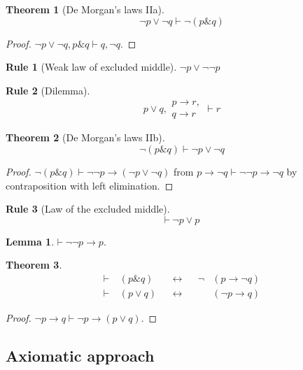 \documentclass{amsbook}
\newcommand{\infers}{\mathrel\vdash}
\newcommand{\theorem}{\mathord\vdash\medspace}
\newcommand{\then}{\mathrel\rightarrow}
\newcommand{\conj}{\mathrel\&}
\newcommand{\eqv}{\mathrel\leftrightarrow}
\newcommand{\disj}{\mathrel\vee}
\theoremstyle{definition}
\newtheorem{frule}{Rule}[chapter]
\newtheorem{thm}{Theorem}[section]
\newtheorem{lmm}{Lemma}[section]
\begin{document}
\begin{thm}[De Morgan's laws IIa]
    $$\neg p \disj \neg q \infers \neg(p \conj q)$$
    \begin{proof}
        $\neg p \disj \neg q, p \conj q \infers q, \neg q$.
    \end{proof}
\end{thm}

\begin{frule}[Weak law of excluded middle]
    $\neg p \disj \neg\neg p$
\end{frule}

\begin{frule}[Dilemma]
    $$p \disj q,\begin{aligned}
            p \then r, \\ q \then r
        \end{aligned} \infers r$$
\end{frule}

\begin{thm}[De Morgan's laws IIb]
    $$\neg(p \conj q) \infers \neg p \disj \neg q$$
    \begin{proof}
        $\neg(p \conj q) \infers \neg\neg p \then (\neg p \disj \neg q)$ from $p \then \neg q \infers \neg\neg p \then \neg q$ by contraposition with left elimination.
    \end{proof}
\end{thm}

\begin{frule}[Law of the excluded middle]
    $$\theorem \neg p \disj p$$
\end{frule}

\begin{lmm}
    $\theorem \neg\neg p \then p$.
\end{lmm}

\begin{thm}
    \begin{align*}
         & \theorem & (p \conj q) &  & \eqv &  & \neg & (p \then \neg q) & \\
         & \theorem & (p \disj q) &  & \eqv &  &      & (\neg p \then q) &
    \end{align*}
    \begin{proof}
        $\neg p \then q \infers \neg p \then (p \disj q)$.
    \end{proof}
\end{thm}

\subsection{Axiomatic approach}
\end{document}
